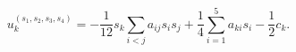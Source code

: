 \begin{equation}
u_k^{(s_1,s_2,s_3,s_4)} = - \frac{1}{12} s_k \sum_{i<j} a_{ij} s_i s_j 
+ \frac{1}{4} \sum_{i=1}^5 a_{ki} s_i - \frac{1}{2} c_k.
\end{equation}

